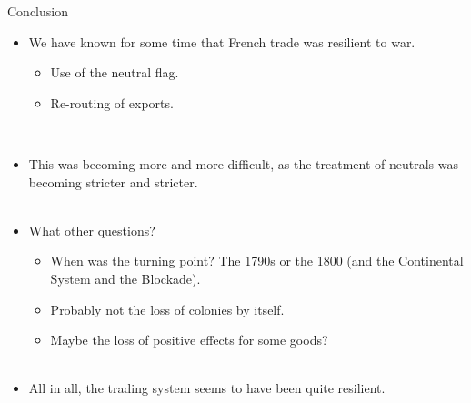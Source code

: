 \documentclass[11pt]{beamer}
\begin{document}
%
%



\begin{frame}{Conclusion}
\begin{itemize}
\item{We have known for some time that French trade was resilient to war.}
\begin{itemize}
\item{Use of the neutral flag.}
\item{Re-routing of exports.}
\end{itemize}~\\
\item{This was becoming more and more difficult, as the treatment of neutrals was becoming stricter and stricter.}\\~\\
\item{What other questions?}
\begin{itemize}
\item{When was the turning point? The 1790s or the 1800 (and the Continental System and the Blockade).}
\item{Probably not the loss of colonies by itself.}
\item{Maybe the loss of positive effects for some goods?}\\~\\
\end{itemize}
\item{All in all, the trading system seems to have been quite resilient.}

\end{itemize}
\end{frame}
\end{document}
